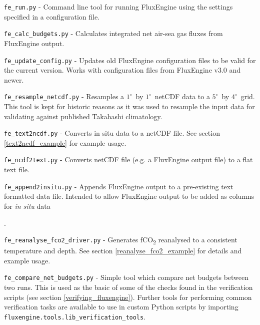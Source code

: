 \documentclass[]{scrartcl}
\begin{document}
{\vspace{0.25cm} \noindent
\vspace{0.25cm} \noindent
\texttt{fe\_run.py} - Command line tool for running FluxEngine using the settings specified in a configuration file.

\vspace{0.25cm} \noindent
\texttt{fe\_calc\_budgets.py} - Calculates integrated net air-sea gas fluxes from FluxEngine output.

\vspace{0.25cm} \noindent
\texttt{fe\_update\_config.py} - Updates old FluxEngine configuration files to be valid for the current version. Works with configuration files from FluxEngine v3.0 and newer.

\vspace{0.25cm} \noindent
\texttt{fe\_resample\_netcdf.py} - Resamples a $1^{\circ}$~by $1^{\circ}$~netCDF data to a $5^{\circ}$~by $4^{\circ}$~grid. This tool is kept for historic reasons as it was used to resample the input data for validating against published Takahashi climatology.

\vspace{0.25cm} \noindent
\texttt{fe\_text2ncdf.py} - Converts in situ data to a netCDF file. See section \ref{text2ncdf_example} for example usage.

\vspace{0.25cm} \noindent
\texttt{fe\_ncdf2text.py} - Converts netCDF file (e.g. a FluxEngine output file) to a flat text file.

\vspace{0.25cm} \noindent
\texttt{fe\_append2insitu.py} - Appends FluxEngine output to a pre-existing text formatted data file. Intended to allow FluxEngine output to be added as columns for \textit{in situ} data}.

\vspace{0.25cm} \noindent
\texttt{fe\_reanalyse\_fco2\_driver.py} - Generates fCO\textsubscript{2} reanalysed to a consistent temperature and depth. See section \ref{reanalyse_fco2_example} for details and example usage.

\vspace{0.25cm} \noindent
\texttt{fe\_compare\_net\_budgets.py} - Simple tool which compare net budgets between two runs. This is used as the basic of some of the checks found in the verification scripts (see section \ref{verifying_fluxengine}). Further tools for performing common verification tasks are available to use in custom Python scripts by importing \texttt{fluxengine.tools.lib\_verification\_tools}.
\end{document}
